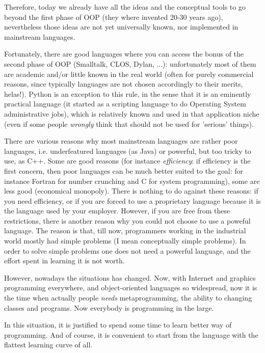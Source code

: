 \documentclass[11pt,english]{book}
\begin{document}
Therefore, today we already have all the ideas 
and the conceptual tools to go beyond the first phase of OOP 
(they where invented 20-30 years ago), nevertheless those ideas are  
not yet universally known, nor implemented in mainstream languages.

Fortunately, there are good languages
where you can access the bonus of the second phase of OOP (Smalltalk, CLOS,
Dylan, ...): unfortunately
most of them are academic and/or little known in the real world
(often for purely commercial reasons, since typically languages are not
chosen accordingly to their merits, helas!). Python is an exception to this
rule, in the sense that it is an eminently practical language (it started
as a scripting language to do Operating System administrative jobs), 
which is relatively known and used in that application niche (even if some
people \emph{wrongly} think that should not be used for 'serious' things).

There are various reasons why most mainstream languages are rather
poor languages, i.e. underfeatured languages (as Java) or powerful, but too
tricky to use, as C++. Some are good reasons (for instance \emph{efficiency}: if
efficiency is the first concern, then poor languages can be much
better suited to the goal: for instance Fortran for number crunching
and C for system programming), some are less good (economical 
monopoly). There is nothing to do against these reasons: if you
need efficiency, or if you are forced to use a proprietary language
because it is the language used by your employer. However, if you
are free from these restrictions, there is another reason why you
could not choose to use a poweful language. The reason is that, 
till now, programmers working in the industrial world mostly had simple 
problems (I mean conceptually simple problems). In order to solve
simple problems one does not need a powerful language, and the effort
spent in learning it is not worth.

However, nowadays the situations has changed. Now, with Internet and graphics
programming everywhere, and object-oriented languages so widespread,
now it is the time when actually people \emph{needs} metaprogramming, the
ability to changing classes and programs. Now everybody is programming
in the large.

In this situation, it is justified to spend some time to learn better
way of programming. And of course, it is convenient to start from
the language with the flattest learning curve of all.


\end{document}

